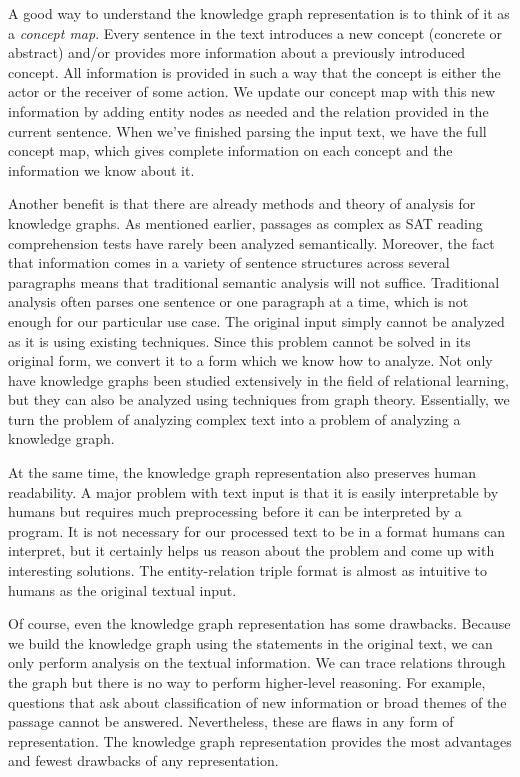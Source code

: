 \documentclass[pageno]{final_paper}
\begin{document}
A good way to understand the knowledge graph representation is to think of it as
a \textit{concept map}. Every sentence in the text introduces a new concept
(concrete or abstract) and/or provides more information about a previously
introduced concept. All information is provided in such a way that the concept
is either the actor or the receiver of some action. We update our concept map
with this new information by adding entity nodes as needed and the relation
provided in the current sentence. When we've finished parsing the input text,
we have the full concept map, which gives complete information on each concept
and the information we know about it.

Another benefit is that there are already methods and theory of analysis for
knowledge graphs. As mentioned earlier, passages as complex as SAT reading
comprehension tests have rarely been analyzed semantically. Moreover, the fact
that information comes in a variety of sentence structures across several
paragraphs means that traditional semantic analysis will not suffice.
Traditional analysis often parses one sentence or one paragraph at a time, which
is not enough for our particular use case. The original input simply cannot be
analyzed as it is using existing techniques. Since this problem cannot be solved
in its original form, we convert it to a form which we know how to analyze. Not
only have knowledge graphs been studied extensively in the field of relational
learning, but they can also be analyzed using techniques from graph theory.
Essentially, we turn the problem of analyzing complex text into a problem of
analyzing a knowledge graph.

At the same time, the knowledge graph representation also preserves human
readability. A major problem with text input is that it is easily interpretable
by humans but requires much preprocessing before it can be interpreted by a
program. It is not necessary for our processed text to be in a format humans can
interpret, but it certainly helps us reason about the problem and come up with
interesting solutions. The entity-relation triple format is almost as intuitive
to humans as the original textual input.

Of course, even the knowledge graph representation has some drawbacks. Because
we build the knowledge graph using the statements in the original text, we can
only perform analysis on the textual information. We can trace relations through
the graph but there is no way to perform higher-level reasoning. For example,
questions that ask about classification of new information or broad themes of
the passage cannot be answered. Nevertheless, these are flaws in any form of
representation. The knowledge graph representation provides the most advantages
and fewest drawbacks of any representation.
\end{document}
